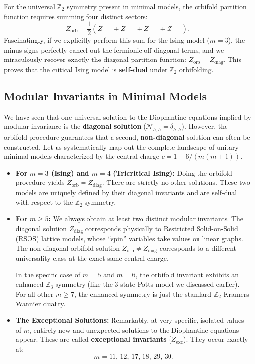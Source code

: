 For the universal \(\mathbb{Z}_2\) symmetry present in minimal models, the orbifold partition function requires summing four distinct sectors:
\[
    Z_{\mathrm{orb}} = \frac{1}{2} \left( Z_{++} + Z_{+-} + Z_{-+} + Z_{--} \right).
\]
Fascinatingly, if we explicitly perform this sum for the Ising model (\(m=3\)), the minus signs perfectly cancel out the fermionic off-diagonal terms, and we miraculously recover exactly the diagonal partition function: \(Z_{\mathrm{orb}} = Z_{\mathrm{diag}}\). This proves that the critical Ising model is \textbf{self-dual} under \(\mathbb{Z}_2\) orbifolding.

\subsection{Modular Invariants in Minimal Models}

We have seen that one universal solution to the Diophantine equations implied by modular invariance is the \textbf{diagonal solution} (\(\mathcal{N}_{h,\bar{h}} = \delta_{h,\bar{h}}\)). However, the orbifold procedure guarantees that a second, \textbf{non-diagonal} solution can often be constructed. Let us systematically map out the complete landscape of unitary minimal models characterized by the central charge \(c = 1 - 6/(m(m+1))\).

\begin{itemize}
    \item \textbf{For \(m=3\) (Ising) and \(m=4\) (Tricritical Ising):}
          Doing the orbifold procedure yields \(Z_{\mathrm{orb}} = Z_{\mathrm{diag}}\). There are strictly no other solutions. These two models are uniquely defined by their diagonal invariants and are self-dual with respect to the \(\mathbb{Z}_2\) symmetry.

    \item \textbf{For \(m \ge 5\):}
          We always obtain at least two distinct modular invariants. The diagonal solution \(Z_{\mathrm{diag}}\) corresponds physically to Restricted Solid-on-Solid (RSOS) lattice models, whose ``spin'' variables take values on linear graphs. The non-diagonal orbifold solution \(Z_{\mathrm{orb}} \neq Z_{\mathrm{diag}}\) corresponds to a different universality class at the exact same central charge.

          In the specific case of \(m=5\) and \(m=6\), the orbifold invariant exhibits an enhanced \(\mathbb{Z}_3\) symmetry (like the 3-state Potts model we discussed earlier). For all other \(m \ge 7\), the enhanced symmetry is just the standard \(\mathbb{Z}_2\) Kramers-Wannier duality.

    \item \textbf{The Exceptional Solutions:}
          Remarkably, at very specific, isolated values of \(m\), entirely new and unexpected solutions to the Diophantine equations appear. These are called \textbf{exceptional invariants} (\(Z_{\mathrm{exc}}\)). They occur exactly at:
          \[
              m = 11, \, 12, \, 17, \, 18, \, 29, \, 30.
          \]
\end{itemize}

